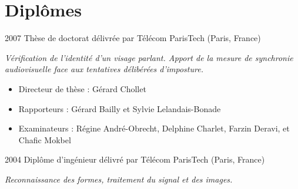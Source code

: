 \documentclass{simplecv}
\begin{document}
\section{Dipl\^{o}mes}

\begin{topic}
\item[2007] Th\`{e}se de doctorat d\'{e}livr\'{e}e par T\'{e}l\'{e}com ParisTech (Paris, France)

\emph{V{\'e}rification de l'identit{\'e} d'un visage parlant. Apport de la mesure de synchronie audiovisuelle face aux tentatives d{\'e}lib{\'e}r{\'e}es d'imposture.}
\begin{itemize}
  \item Directeur de th\`{e}se : G\'{e}rard Chollet
  \item Rapporteurs : G\'{e}rard Bailly et Sylvie Lelandais-Bonade
  \item Examinateurs : R\'{e}gine Andr\'{e}-Obrecht, Delphine Charlet, Farzin Deravi, et Chafic Mokbel
\end{itemize}

\item[2004] Dipl\^{o}me d'ing\'{e}nieur d\'{e}livr\'{e} par T\'{e}l\'{e}com ParisTech (Paris, France)

\emph{Reconnaissance des formes, traitement du signal et des images.}
\end{topic}

\end{document}
